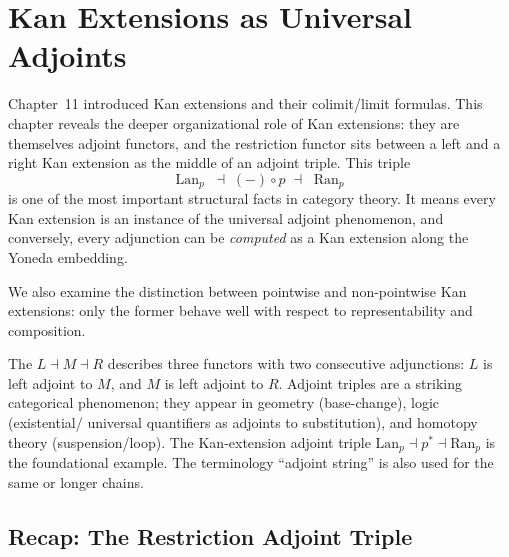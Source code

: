 
\chapter{Kan Extensions as Universal Adjoints}

\begin{overviewbox}
Chapter~11 introduced Kan extensions and their colimit/limit formulas. This
chapter reveals the deeper organizational role of Kan extensions: they are
themselves adjoint functors, and the restriction functor sits between a left
and a right Kan extension as the middle of an adjoint triple. This triple
\begin{equation*}
  \operatorname{Lan}_p \;\dashv\; (-) \circ p \;\dashv\; \operatorname{Ran}_p
\end{equation*}
is one of the most important structural facts in category theory. It means every
Kan extension is an instance of the universal adjoint phenomenon, and conversely,
every adjunction can be \emph{computed} as a Kan extension along the Yoneda
embedding.

We also examine the distinction between pointwise and non-pointwise Kan
extensions: only the former behave well with respect to representability and
composition.
\end{overviewbox}


\begin{nameorigin}
The  $L \dashv M \dashv R$ describes three functors
with two consecutive adjunctions: $L$ is left adjoint to $M$, and $M$
is left adjoint to $R$. Adjoint triples are a striking categorical
phenomenon; they appear in geometry (base-change), logic (existential/
universal quantifiers as adjoints to substitution), and homotopy theory
(suspension/loop). The Kan-extension adjoint triple
$\mathrm{Lan}_p \dashv p^* \dashv \mathrm{Ran}_p$ is the foundational
example. The terminology ``adjoint string'' is also used for the same
or longer chains.
\end{nameorigin}

\section{Recap: The Restriction Adjoint Triple}
\label{sec:kan-recap}

